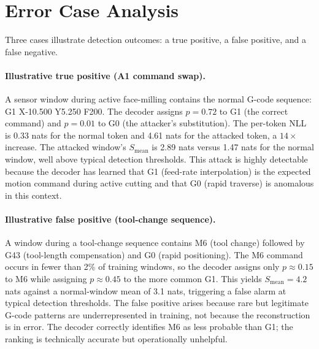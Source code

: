 
\section{Error Case Analysis}
\label{app:errors}

Three cases illustrate detection outcomes: a true positive, a false positive, and a false negative.

\paragraph{Illustrative true positive (A1 command swap).}
A sensor window during active face-milling contains the normal G-code sequence: G1 X-10.500 Y5.250 F200.
The decoder assigns $p = 0.72$ to G1 (the correct command) and $p = 0.01$ to G0 (the attacker's substitution).
The per-token NLL is 0.33 nats for the normal token and 4.61 nats for the attacked token, a $14\times$ increase.
The attacked window's $S_{\text{mean}}$ is 2.89 nats versus 1.47 nats for the normal window, well above typical detection thresholds.
This attack is highly detectable because the decoder has learned that G1 (feed-rate interpolation) is the expected motion command during active cutting and that G0 (rapid traverse) is anomalous in this context.

\paragraph{Illustrative false positive (tool-change sequence).}
A window during a tool-change sequence contains M6 (tool change) followed by G43 (tool-length compensation) and G0 (rapid positioning).
The M6 command occurs in fewer than 2\% of training windows, so the decoder assigns only $p \approx 0.15$ to M6 while assigning $p \approx 0.45$ to the more common G1.
This yields $S_{\text{mean}} = 4.2$ nats against a normal-window mean of 3.1 nats, triggering a false alarm at typical detection thresholds.
The false positive arises because rare but legitimate G-code patterns are underrepresented in training, not because the reconstruction is in error.
The decoder correctly identifies M6 as less probable than G1; the ranking is technically accurate but operationally unhelpful.

